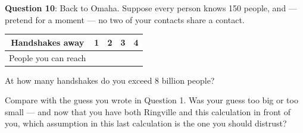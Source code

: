 \documentclass[a4paper, 14pt]{extarticle}
\begin{document}
\vspace{10em}

{\bf Question 10}:
Back to Omaha. Suppose every person knows 150 people, and --- pretend for a
moment --- no two of your contacts share a contact.

\begin{center}
\begin{tabular}{|c|p{2.5cm}|p{2.5cm}|p{2.5cm}|p{2.5cm}|}
\hline
Handshakes away & 1 & 2 & 3 & 4 \\
\hline
People you can reach & & & & \\[0.6cm]
\hline
\end{tabular}
\end{center}

At how many handshakes do you exceed 8 billion people? \underline{\hspace{2cm}}

Compare with the guess you wrote in Question 1. Was your guess too big or too
small --- and now that you have both Ringville and this calculation in front of
you, which assumption in this last calculation is the one you should distrust?

\underline{\hspace{\textwidth}}
\end{document}

